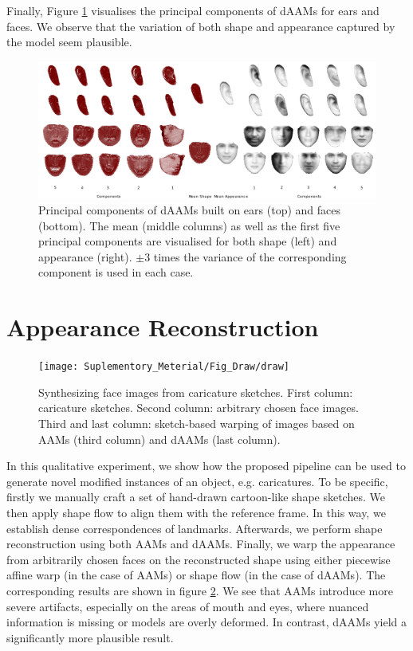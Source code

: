 Finally, Figure \ref{fig:pcamodel} visualises the principal components of dAAMs for ears and faces. We observe that the variation of both shape and appearance captured by the model seem plausible.

\begin{figure}[!t]
\centering
\includegraphics[width=\textwidth]{Suplementory_Meterial/Models/models}
\caption{Principal components of dAAMs built on ears (top) and faces (bottom). The mean (middle columns) as well as the first five principal components are visualised for both shape (left) and appearance (right). $\pm 3$ times the variance of the corresponding component is used in each case.}
\label{fig:pcamodel}
\end{figure}




\section{Appearance Reconstruction}
\label{sec:reconstruct}

\begin{figure}[!b]
    \centering
    \texttt{[image: Suplementory\_Meterial/Fig\_Draw/draw]}
    \caption{Synthesizing face images from caricature sketches. First column: caricature sketches. Second column: arbitrary chosen face images. Third and last column: sketch-based warping of images based on AAMs (third column) and dAAMs (last column).}
    \label{fig:draw}
\end{figure}

In this qualitative experiment, we show how the proposed pipeline can be used to generate novel modified instances of an object, e.g. caricatures. To be specific, firstly we manually craft a set of hand-drawn cartoon-like shape sketches. We then apply shape flow to align them with the reference frame. In this way, we establish dense correspondences of landmarks. Afterwards, we perform shape reconstruction using both AAMs and dAAMs. Finally, we warp the appearance from arbitrarily chosen faces on the reconstructed shape using either piecewise affine warp (in the case of AAMs) or shape flow (in the case of dAAMs). The corresponding results are shown in figure \ref{fig:draw}. We see that AAMs introduce more severe artifacts, especially on the areas of mouth and eyes, where nuanced information is missing or models are overly deformed. In contrast, dAAMs yield a significantly more plausible result.



